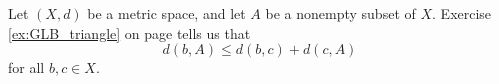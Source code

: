 \begin{comment}

\ExerciseSolution

\ba

\item Let $f(x) = ax+b$ for some real numbers $a$ and $b$ with $a > 0$. Let $p \in \R$ and let $r > 0$. Then $f^{-1}(B(f(p),r) = B\left(p, \frac{r}{m}\right)$ and so $f$ is continuous at $x=p$. Since $f$ is continuous at every real input, $f$ is a continuous function. 

\item Let $f(x) = ax^2+bx+c$ for some real numbers $a$, $b$, and $c$ with $a > 0$. Notice that $f$ attains its minimum value of $f(m) = c-\frac{b^2}{4a}$ at $m = -\frac{b}{2a}$. Let $p \in \R$ and let $r > 0$. We consider cases.
\begin{description}
\item[$p > m$:] Let $r' = \min\{r, |f(p)-f(m)|\}$. Then $B(f(p),r') \subseteq B(f(p),r)$ and $f^{-1}(B(f(p),r')) \subseteq (m, \infty)$. So there exist unique $x_1$, $x_2$ in $(m, \infty)$ such that $f(x_1) = f(p)-r'$ and $f(x_2) = f(p)+r'$. Let $s = \min\{p-x_1, x_2-p\}$. Then $B(p,s) \subseteq f^{-1}(B(f(p), r') \subseteq f^{-1}(B(f(p), r)$. 

\item[$p < m$:] Let $r' = \min\{r, |f(p)-f(m)|\}$. Then $B(f(p),r') \subseteq B(f(p),r)$ and $f^{-1}(B(f(p),r')) \subseteq (-\infty,m)$. So there exist unique $x_1$, $x_2$ in $(m, \infty)$ such that $f(x_1) = f(p)+r'$ and $f(x_2) = f(p)-r'$. Let $s = \min\{p-x_1, x_2-p\}$. Then $B(p,s) \subseteq f^{-1}(B(f(p), r') \subseteq f^{-1}(B(f(p), r)$. 

\item[$p = m$:] In this case there exist $x_1$, $x_2$ in $\R$ such that $f(x_1) = f(p)+r = f(x_2)$ and $x_1 < x_2$. Let $s = p-x_1$. Then $B(p,s) \subseteq f^{-1}(B(f(p), r)$. 

\end{description}

In each case, the inverse image of any open ball that has $f(p)$ as an element contains an open ball that has $p$ as an element. We conclude that $f$ is a continuous function. 

\ea

\end{comment}

\item \label{ex:metric_continuous} Let $(X,d)$ be a metric space, and let $A$ be a nonempty subset of $X$. Exercise \ref{ex:GLB_triangle} on page \pageref{ex:GLB_triangle} tells us that 
\[d(b,A) \leq d(b,c) + d(c,A)\]
 for all $b, c \in X$. 


